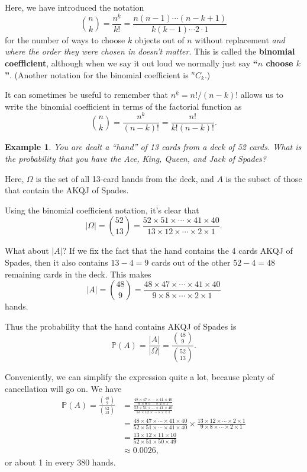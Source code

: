\documentclass[
  a4paper,
]{book}
\theoremstyle{definition}
\theoremstyle{definition}
\newtheorem{example}{Example}[chapter]
\theoremstyle{definition}
\theoremstyle{definition}
\theoremstyle{remark}
\begin{document}
Here, we have introduced the notation
\[ \binom{n}{k} = \frac{{n}^{\underline{k}}}{k!} = \frac{n(n-1) \cdots (n-k+1)}{k(k-1)\cdots2\cdot1}  \]
for the number of ways to choose \(k\) objects out of \(n\) without replacement \emph{and where the order they were chosen in doesn't matter}. This is called the \textbf{binomial coefficient}, although when we say it out loud we normally just say \textbf{``\(n\) choose \(k\)''}. (Another notation for the binomial coefficient is \({}^n C_k\).)

It can sometimes be useful to remember that \({n}^{\underline{k}} = n!/(n-k)!\) allows us to write the binomial coefficient in terms of the factorial function as
\[ \binom nk = \frac{{n}^{\underline{k}}}{(n-k)!} = \frac{n!}{k!(n-k)!} . \]

\begin{example}
\emph{You are dealt a ``hand'' of 13 cards from a deck of 52 cards. What is the probability that you have the Ace, King, Queen, and Jack of Spades?}

Here, \(\Omega\) is the set of all 13-card hands from the deck, and \(A\) is the subset of those that contain the AKQJ of Spades.

Using the binomial coefficient notation, it's clear that
\[ |\Omega| = \binom{52}{13} = \frac{52\times51\times\cdots\times41\times40}{13\times12\times\cdots\times2\times1} . \]

What about \(|A|\)? If we fix the fact that the hand contains the 4 cards AKQJ of Spades, then it also contains \(13-4=9\) cards out of the other \(52-4 = 48\) remaining cards in the deck. This makes
\[ |A| = \binom{48}{9} = \frac{48\times47\times\cdots\times41\times40}{9\times8\times\cdots\times2\times1}\]
hands.

Thus the probability that the hand contains AKQJ of Spades is
\[ \mathbb P(A) = \frac{|A|}{|\Omega|} = \frac{\binom{48}{9}}{\binom{52}{13}} . \]

Conveniently, we can simplify the expression quite a lot, because plenty of cancellation will go on. We have
\begin{align*}
\mathbb P(A) = \frac{\binom{48}{9}}{\binom{52}{13}}
  &= \frac{\frac{48\times47\times\cdots\times41\times40}{9\times8\times\cdots\times2\times1}}{\frac{52\times51\times\cdots\times41\times40}{13\times12\times\cdots\times2\times1}} \\
  &= \frac{48\times47\times\cdots\times41\times40}{52\times51\times\cdots\times41\times40} \times \frac{13\times12\times\cdots\times2\times1}{9\times8\times\cdots\times2\times1} \\
  &= \frac{13\times12\times11\times10}{52\times51\times50\times49} \\
  &\approx 0.0026 ,
\end{align*}
or about 1 in every 380 hands.
\end{example}
\end{document}
